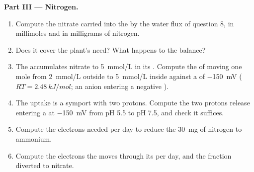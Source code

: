 \begin{problem}
\medskip
\noindent\textbf{Part III --- Nitrogen.}
\begin{enumerate}[resume]
  \item Compute the nitrate carried into the  by the water flux
        of question 8, in millimoles and in milligrams of nitrogen.
  \item Does it cover the plant's need? What happens to the balance?
  \item The  accumulates nitrate to \qty{5}{mmol/L} in its .
        Compute the  of moving one mole from
        \qty{2}{mmol/L} outside to \qty{5}{mmol/L} inside against a
         of \qty{-150}{mV} ($RT = \qty{2.48}{kJ/mol}$;
        an anion entering a negative ).
  \item The uptake is a symport with two protons. Compute the  two protons release entering a  at \qty{-150}{mV}
        from pH 5.5 to pH 7.5, and check it suffices.
  \item Compute the electrons needed per day to reduce the
        \qty{30}{mg} of nitrogen to ammonium.
  \item Compute the electrons the  moves through its 
        per day, and the fraction diverted to nitrate.
\end{enumerate}


\end{problem}

